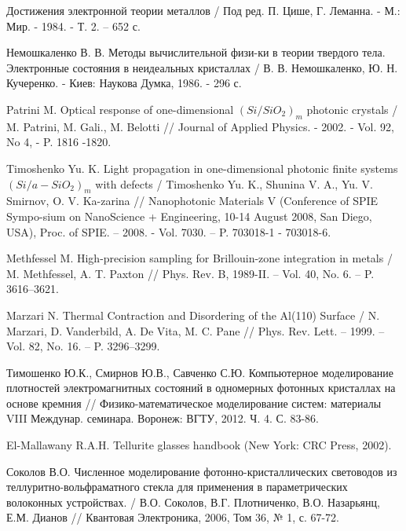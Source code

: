 \begin{thebibliography}{99}
Достижения электронной теории металлов / Под ред. П. Цише, Г. Леманна. - М.: Мир. - 1984. - Т. 2. – 652 с.

Немошкаленко В. В. Методы вычислительной физи-ки в теории твердого тела. Электронные состояния в неидеальных кристаллах / В. В. Немошкаленко, Ю. Н. Кучеренко. - Киев: Наукова Думка, 1986. - 296 с.

Patrini M. Optical response of one-dimensional $(Si/SiO_2)_m$ photonic crystals / M. Patrini, M. Gali., M. Belotti // Journal of Applied Physics. - 2002. - Vol. 92, No 4, - P. 1816 -1820.

Timoshenko Yu. K. Light propagation in one-dimensional photonic finite systems $(Si/a-SiO_2)_m$ with defects / Timoshenko Yu. K., Shunina V. A., Yu. V. Smirnov, O. V. Ka-zarina // Nanophotonic Materials V (Conference of SPIE Sympo-sium on NanoScience + Engineering, 10-14 August 2008, San Diego, USA), Proc. of SPIE. – 2008. - Vol. 7030. – P. 703018-1 - 703018-6.


Methfessel M. High-precision sampling for Brillouin-zone integration in metals / M. Methfessel, A. T. Paxton // Phys. Rev. B, 1989-II. -- Vol. 40, No. 6. -- P. 3616--3621.

Marzari N. Thermal Contraction and Disordering of the Al(110) Surface / N. Marzari, D. Vanderbild, A. De Vita, M. C. Pane // Phys. Rev. Lett. -- 1999. -- Vol. 82, No. 16. -- P. 3296--3299.

Тимошенко Ю.К., Смирнов Ю.В., Савченко С.Ю. Компьютерное моделирование плотностей электромагнитных состояний
в одномерных фотонных кристаллах на основе кремния // Физико-математическое моделирование систем: материалы
VIII Междунар. семинара. Воронеж: ВГТУ, 2012. Ч. 4. С. 83-86.

El-Mallawany R.A.H. Tellurite glasses handbook (New York: CRC Press, 2002).

Соколов В.О. Численное моделирование фотонно-кристаллических световодов из теллуритно-вольфраматного стекла для применения в параметрических волоконных устройствах. /
В.О. Соколов, В.Г. Плотниченко, В.О. Назарьянц, Е.М. Дианов // Квантовая Электроника, 2006, Том 36, № 1, с. 67-72.





\end{thebibliography}
